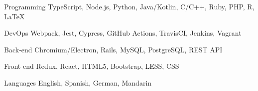 

\begin{cvskills}

  \cvskill
    {Programming} %
    {TypeScript, Node.js, Python, Java/Kotlin, C/C++, Ruby, PHP, R, LaTeX} %

  \cvskill
    {DevOps} %
    {Webpack, Jest, Cypress, GitHub Actions, TravisCI, Jenkins, Vagrant} %

  \cvskill
    {Back-end} %
    {Chromium/Electron, Rails, MySQL, PostgreSQL, REST API} %

  \cvskill
    {Front-end} %
    {Redux, React, HTML5, Bootstrap, LESS, CSS} %

  \cvskill
    {Languages} %
    {English, Spanish, German, Mandarin} %

\end{cvskills}
